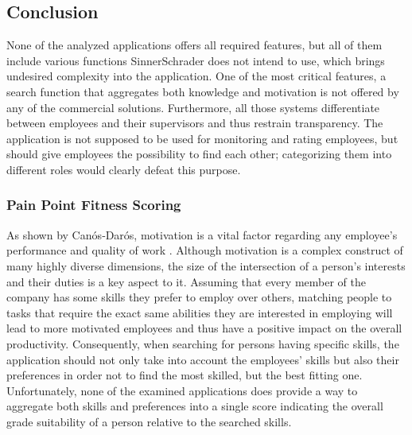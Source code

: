 \newpage

\subsection{Conclusion}
None of the analyzed applications offers all required features, but all of them include various functions SinnerSchrader does not intend to use, which brings undesired complexity into the application.
One of the most critical features, a search function that aggregates both knowledge and motivation is not offered by any of the commercial solutions.
Furthermore, all those systems differentiate between employees and their supervisors and thus restrain transparency. The application is not supposed to be used for monitoring and rating employees, but should give employees the possibility to find each other; categorizing them into different roles would clearly defeat this purpose.

\subsubsection{Pain Point Fitness Scoring}
As shown by Canós‐Darós, motivation is a vital factor regarding any employee's performance and quality of work \cite{CanosDaros2013}.
Although motivation is a complex construct of many highly diverse dimensions, the size of the intersection of a person's interests and their duties is a key aspect to it. Assuming that every member of the company has some skills they prefer to employ over others, matching people to tasks that require the exact same abilities they are interested in employing will lead to more motivated employees and thus have a positive impact on the overall productivity.
Consequently, when searching for persons having specific skills, the application should not only take into account the employees' skills but also their preferences in order not to find the most skilled, but the best fitting one. Unfortunately, none of the examined applications does provide a way to aggregate both skills and preferences into a single score indicating the overall grade suitability of a person relative to the searched skills.
